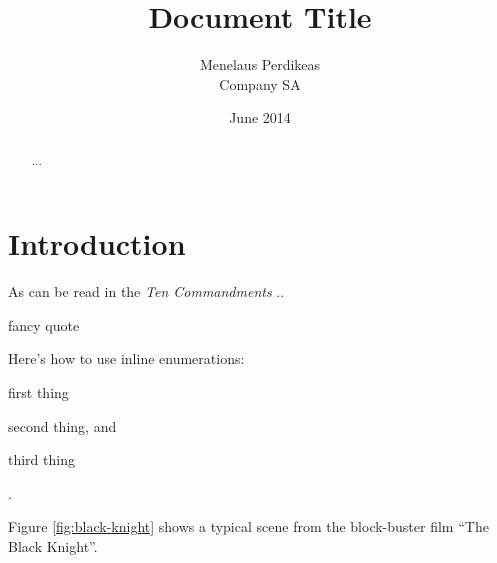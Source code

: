 \documentclass[11pt,twoside,a4paper,pagesize]{report}
\begin{document}
\title{\color{blue}Document Title}
\author{Menelaus Perdikeas\\ Company SA}
\date{June 2014}
\maketitle

\tableofcontents
\listoffigures
\lstlistoflistings

\renewcommand{\abstractname}{Executive Summary}
\begin{abstract}
...
\end{abstract}

\chapter{Introduction}
As can be read in the \textit{Ten Commandments} \cite{ref:ten-commandments} ..

\begin{quoting}
fancy quote
\end{quoting}

Here's how to use inline enumerations:
\begin{inparaenum}[i)]
\item first thing
\item second thing, and
\item third thing
\end{inparaenum}.

Figure \ref{fig:black-knight} shows a typical scene from the block-buster
film ``The Black Knight''.

\end{document}
